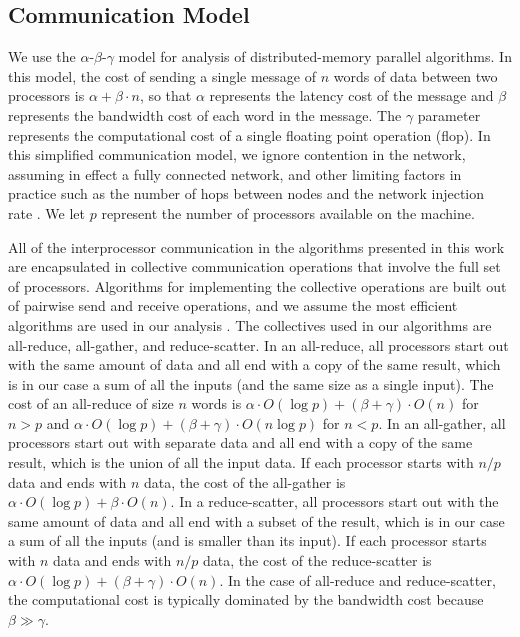 \documentclass[conference,compsoc]{IEEEtran}
\begin{document}
\subsection{Communication Model}

We use the $\alpha$-$\beta$-$\gamma$ model \cite{TRG05,CH+07,BCDH+14} for analysis of distributed-memory parallel algorithms. 
In this model, the cost of sending a single message of $n$ words of data between two processors is $\alpha + \beta \cdot n$, so that $\alpha$ represents the latency cost of the message and $\beta$ represents the bandwidth cost of each word in the message.
The $\gamma$ parameter represents the computational cost of a single floating point operation (flop).
In this simplified communication model, we ignore contention in the network, assuming in effect a fully connected network, and other limiting factors in practice such as the number of hops between nodes and the network injection rate \cite{GOS16}.
We let $p$ represent the number of processors available on the machine.

All of the interprocessor communication in the algorithms presented in this work are encapsulated in collective communication operations that involve the full set of processors.
Algorithms for implementing the collective operations are built out of pairwise send and receive operations, and we assume the most efficient algorithms are used in our analysis \cite{TRG05,CH+07}.
The collectives used in our algorithms are all-reduce, all-gather, and reduce-scatter.
In an all-reduce, all processors start out with the same amount of data and all end with a copy of the same result, which is in our case a sum of all the inputs (and the same size as a single input).
The cost of an all-reduce of size $n$ words is $\alpha \cdot O(\log p) + (\beta+\gamma) \cdot O(n)$ for $n>p$ and $\alpha \cdot O(\log p) + (\beta+\gamma) \cdot O(n\log p)$ for $n<p$.
In an all-gather, all processors start out with separate data and all end with a copy of the same result, which is the union of all the input data.
If each processor starts with $n/p$ data and ends with $n$ data, the cost of the all-gather is $\alpha \cdot O(\log p) + \beta \cdot O(n)$.
In a reduce-scatter, all processors start out with the same amount of data and all end with a subset of the result, which is in our case a sum of all the inputs (and is smaller than its input).
If each processor starts with $n$ data and ends with $n/p$ data, the cost of the reduce-scatter is $\alpha \cdot O(\log p) + (\beta+\gamma) \cdot O(n)$.
In the case of all-reduce and reduce-scatter, the computational cost is typically dominated by the bandwidth cost because $\beta \gg \gamma$.
\end{document}
